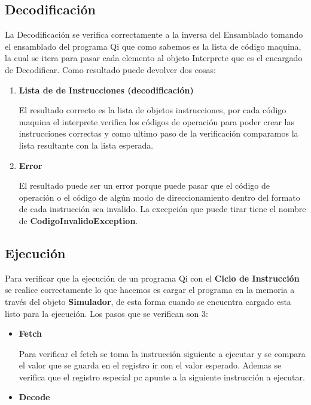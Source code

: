 \begin{enumerate}
\subsection{Decodificación}

La Decodificación se verifica correctamente a la inversa del Ensamblado tomando el ensamblado del programa Qi que como sabemos es la lista de código maquina, la cual se itera para pasar cada elemento al objeto Interprete que es el encargado de Decodificar. Como resultado puede devolver dos cosas: 
\begin{enumerate}
\item \textbf{Lista de de Instrucciones (decodificación)} 

El resultado correcto es la lista de objetos instrucciones, por cada código maquina el interprete verifica los códigos de operación para poder crear las instrucciones correctas y como ultimo paso de la verificación comparamos la lista resultante con la lista esperada.
\item\textbf{Error}

El resultado puede ser un error porque puede pasar que el código de operación o el código de algún modo de direccionamiento dentro del formato de cada instrucción sea invalido. La excepción que puede tirar tiene el nombre de \textbf{CodigoInvalidoException}.   
\end{enumerate}

\subsection{Ejecución}

Para verificar que la ejecución de un programa Qi con el \textbf{Ciclo de Instrucción} se realice correctamente lo que hacemos es cargar el programa en la memoria a través del objeto \textbf{Simulador}, de esta forma cuando se encuentra cargado esta listo para la ejecución. Los pasos que se verifican son 3:

\begin{itemize}
\item \textbf{Fetch} 

Para verificar el fetch se toma la instrucción siguiente a ejecutar y se compara el valor que se guarda en el registro ir con el valor esperado. Ademas se verifica que el registro especial pc apunte a la siguiente instrucción a ejecutar.

\item \textbf{Decode}


\end{itemize}
\end{enumerate}
